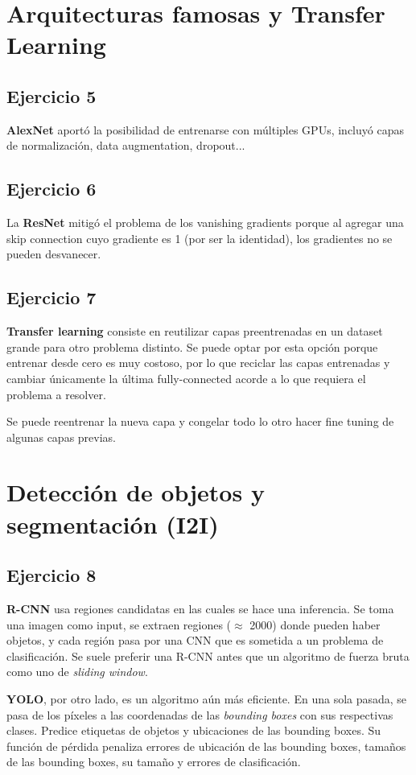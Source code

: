 \documentclass[a4paper,11pt]{article}
\begin{document}
\section*{Arquitecturas famosas y Transfer Learning}
\subsection*{Ejercicio 5}
\textbf{AlexNet} aportó la posibilidad de entrenarse con múltiples GPUs, incluyó capas de normalización, data augmentation, dropout...
\subsection*{Ejercicio 6}
La \textbf{ResNet} mitigó el problema de los vanishing gradients porque al agregar una skip connection cuyo gradiente es 1 (por ser la identidad), los gradientes no se pueden desvanecer.
\subsection*{Ejercicio 7}
\textbf{Transfer learning} consiste en reutilizar capas preentrenadas en un dataset grande para otro problema distinto. Se puede optar por esta opción porque entrenar desde cero es muy costoso, por lo que reciclar las capas entrenadas y cambiar únicamente la última fully-connected acorde a lo que requiera el problema a resolver.

Se puede reentrenar la nueva capa y congelar todo lo otro hacer fine tuning de algunas capas previas.

\section*{Detección de objetos y segmentación (I2I)}
\subsection*{Ejercicio 8}
\textbf{R-CNN} usa regiones candidatas en las cuales se hace una inferencia. Se toma una imagen como input, se extraen regiones ($\approx$ 2000) donde pueden haber objetos, y cada región pasa por una CNN que es sometida a un problema de clasificación. Se suele preferir una R-CNN antes que un algoritmo de fuerza bruta como uno de \textit{sliding window}.

\textbf{YOLO}, por otro lado, es un algoritmo aún más eficiente. En una sola pasada, se pasa de los píxeles a las coordenadas de las \textit{bounding boxes} con sus respectivas clases. Predice etiquetas de objetos y ubicaciones de las bounding boxes. Su función de pérdida penaliza errores de ubicación de las bounding boxes, tamaños de las bounding boxes, su tamaño y errores de clasificación.
\end{document}
